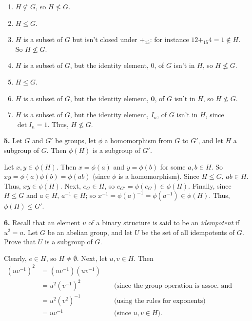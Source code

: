 \documentclass[10pt,]{book}
\theoremstyle{plain}
\theoremstyle{definition}
\theoremstyle{definition}
\theoremstyle{definition}
\theoremstyle{definition}
\numberwithin{equation}{section}
\def\0{\mathbf 0}
\newcommand{\amp}{ & }
\begin{document}
\par\smallskip
\leavevmode%
\begin{enumerate}[label=(\alph*)]
\item\hypertarget{li-236}{}
          \(H\not\subseteq G\), so \(H\not\leq G\).
\item\hypertarget{li-237}{}
          \(H\leq G\).
\item\hypertarget{li-238}{}
          \(H\) is a subset of \(G\) but isn't closed under \(+_{15}\): for instance \(12+_{15}4=1\not\in H\).  So \(H\not\leq G\).
\item\hypertarget{li-239}{}
          \(H\) is a subset of \(G\), but the identity element, 0, of \(G\) isn't in \(H\), so \(H\not\leq G\).
\item\hypertarget{li-240}{}
          \(H\leq G\).
\item\hypertarget{li-241}{}
          \(H\) is a subset of \(G\), but the identity element, \(\0\), of \(G\) isn't in \(H\), so \(H\not\leq G\).
\item\hypertarget{li-242}{}
          \(H\) is a subset of \(G\), but the identity element, \(I_n\), of \(G\) isn't in \(H\), since \(\det I_n=1\).  Thus, \(H\not\leq G\).
\end{enumerate}
\par\smallskip
\noindent\textbf{5.}\quad{}
        Let \(G\) and \(G'\) be groups, let \(\phi\) a homomorphism from \(G\) to \(G'\), and let \(H\) a subgroup of \(G\). Then \(\phi(H)\) is a subgroup of \(G'\).
\par\smallskip

      Let \(x,y\in \phi(H)\). Then \(x=\phi(a)\) and \(y=\phi(b)\) for some \(a,b\in H\). So \(xy=\phi(a)\phi(b)=\phi(ab)\) (since \(\phi\) is a homomorphism). Since \(H\leq G\), \(ab\in H\). Thus, \(xy\in \phi(H)\). Next, \(e_G\in H\), so \(e_{G'}=\phi(e_G)\in \phi(H)\). Finally, since \(H\leq G\) and \(a\in H\), \(a^{-1}\in H\); so \(x^{-1}=\phi(a)^{-1}=\phi(a^{-1}) \in \phi(H)\). Thus, \(\phi(H)\leq G'\).
\par\smallskip
\noindent\textbf{6.}\quad{}
        Recall that an element \(u\) of a binary structure is said to be an \emph{idempotent} if \(u^2=u\). Let \(G\) be an abelian group, and let \(U\) be the set of all idempotents of \(G\). Prove that \(U\) is a subgroup of \(G\).
\par\smallskip

      Clearly, \(e\in H\), so \(H\neq \emptyset\). Next, let \(u,v\in H\). Then
\begin{align*}
(uv^{-1})^2\amp =(uv^{-1})(uv^{-1})\amp \amp\\
\amp =u^2(v^{-1})^2 \amp \amp \text{ (since the group operation is assoc. and comm.) }\\
\amp =u^2(v^2)^{-1} \amp \amp \text{ (using the rules for exponents) }\\
\amp =uv^{-1}\amp \amp \text{ (since \(u,v\in H\)). }
\end{align*}
\end{document}
